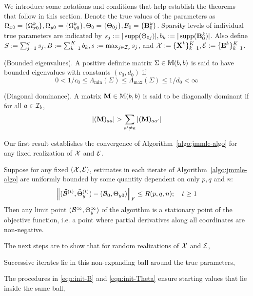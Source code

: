 We introduce some notations and conditions that help establish the theorems that follow in this section. Denote the true values of the parameters as $\Omega_{x 0} = \{ \Omega_{x 0}^k \}, \Omega_{y 0} = \{ \Omega_{y 0}^k \}, \Theta_0 = \{ \Theta_{0 j} \}, {\cal{B}}_0 = \{ {\mathbf{B}}_0^k \}$. Sparsity levels of individual true parameters are indicated by $s_j := | \operatorname*{supp} (\Theta_{0j})|, b_k := | \operatorname*{supp}({\mathbf{B}}^k_0) |$. Also define $S := \sum_{j=1}^q s_j, B:= \sum_{k=1}^K b_k, s:= \max_{j \in {\cal{I}}_q } s_j$, and ${\cal{X}} := \{ {\mathbf{X}}^k \}_{k=1}^K, {\cal{E}} := \{ {\mathbf{E}}^k \}_{k=1}^K$.

\vspace{1em}
 (Bounded eigenvalues). A positive definite matrix $\Sigma \in {\mathbb{M}}(b,b)$ is said to have bounded eigenvalues with constants $(c_0, d_0)$ if
%
\[
0 < 1/c_0 \leq \Lambda_{\min} (\Sigma) \leq \Lambda_{\max} (\Sigma) \leq 1/d_0 < \infty
\]

 (Diagonal dominance). A matrix ${\mathbf{M}}  \in {\mathbb{M}}(b,b)$ is said to be diagonally dominant if for all $a \in {\cal{I}}_b$,
%
$$
| ({\mathbf{M}})_{aa} | > \sum_{a' \neq a} |({\mathbf{M}})_{aa'} |
$$

Our first result establishes the convergence of Algorithm~\ref{algo:jmmle-algo} for any fixed realization of ${\cal{X}}$ and ${\cal{E}}$.

\begin{Theorem}
\label{thm:algo-convergence}
Suppose for any fixed $({\cal{X}}, {\cal{E}})$, estimates in each iterate of Algorithm~\ref{algo:jmmle-algo} are uniformly bounded by some quantity dependent on only $p, q$ and $n$:
%
\begin{align}
\left\| (\widehat {{\cal{B}}}^{(t)}, \widehat \Theta_y^{(t)}) - ( {\cal{B}}_0, \Theta_{y 0}) \right\|_F
\leq R(p,q,n);
\quad t \geq 1
\end{align}
%
Then any limit point $({\cal{B}}^\infty, \Theta_y^\infty)$ of the algorithm is a stationary point of the objective function, i.e. a point where partial derivatives along all coordinates are non-negative.
\end{Theorem}

The next steps are to show that for random realizations of ${\cal{X}}$ and ${\cal{E}}$,
%

\vspace{1em}
 Successive iterates lie in this non-expanding ball around the true parameters,

 The procedures in \eqref{eqn:init-B} and \eqref{eqn:init-Theta} ensure starting values that lie inside the same ball,
%

